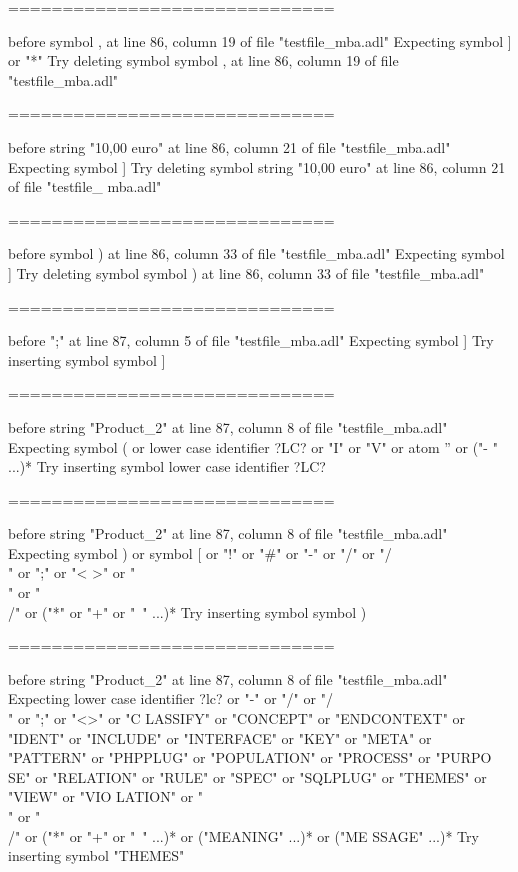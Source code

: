 \begin{description}
\begin{haskell}
==============================

before symbol , at line 86, column 19 of file "testfile_mba.adl"
Expecting symbol ] or "*"
Try deleting symbol symbol , at line 86, column 19 of file "testfile_mba.adl"

==============================

before string "10,00 euro" at line 86, column 21 of file "testfile_mba.adl"
Expecting symbol ]
Try deleting symbol string "10,00 euro" at line 86, column 21 of file "testfile_
mba.adl"

==============================

before symbol ) at line 86, column 33 of file "testfile_mba.adl"
Expecting symbol ]
Try deleting symbol symbol ) at line 86, column 33 of file "testfile_mba.adl"

==============================

before ";" at line 87, column 5 of file "testfile_mba.adl"
Expecting symbol ]
Try inserting symbol symbol ]

==============================

before string "Product_2" at line 87, column 8 of file "testfile_mba.adl"
Expecting symbol ( or lower case identifier ?LC? or "I" or "V" or atom '' or ("-
" ...)*
Try inserting symbol lower case identifier ?LC?

==============================

before string "Product_2" at line 87, column 8 of file "testfile_mba.adl"
Expecting symbol ) or symbol [ or "!" or "#" or "-" or "/" or "/\\" or ";" or "<
>" or "\\" or "\\/" or ("*" or "+" or "~" ...)*
Try inserting symbol symbol )

==============================

before string "Product_2" at line 87, column 8 of file "testfile_mba.adl"
Expecting lower case identifier ?lc? or "-" or "/" or "/\\" or ";" or "<>" or "C
LASSIFY" or "CONCEPT" or "ENDCONTEXT" or "IDENT" or "INCLUDE" or "INTERFACE" or
"KEY" or "META" or "PATTERN" or "PHPPLUG" or "POPULATION" or "PROCESS" or "PURPO
SE" or "RELATION" or "RULE" or "SPEC" or "SQLPLUG" or "THEMES" or "VIEW" or "VIO
LATION" or "\\" or "\\/" or ("*" or "+" or "~" ...)* or ("MEANING" ...)* or ("ME
SSAGE" ...)*
Try inserting symbol "THEMES"


\end{haskell}
\end{description}
